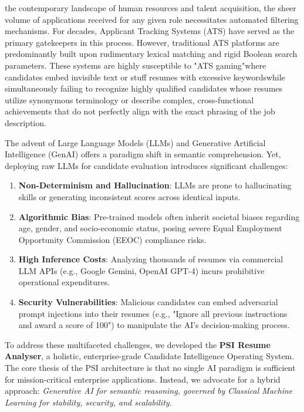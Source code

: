 \documentclass[10pt,journal,compsoc]{IEEEtran}
\begin{document}
 the contemporary landscape of human resources and talent acquisition, the sheer volume of applications received for any given role necessitates automated filtering mechanisms. For decades, Applicant Tracking Systems (ATS) have served as the primary gatekeepers in this process. However, traditional ATS platforms are predominantly built upon rudimentary lexical matching and rigid Boolean search parameters. These systems are highly susceptible to "ATS gaming"where candidates embed invisible text or stuff resumes with excessive keywordswhile simultaneously failing to recognize highly qualified candidates whose resumes utilize synonymous terminology or describe complex, cross-functional achievements that do not perfectly align with the exact phrasing of the job description.

The advent of Large Language Models (LLMs) and Generative Artificial Intelligence (GenAI) offers a paradigm shift in semantic comprehension. Yet, deploying raw LLMs for candidate evaluation introduces significant challenges:
\begin{enumerate}
    \item \textbf{Non-Determinism and Hallucination}: LLMs are prone to hallucinating skills or generating inconsistent scores across identical inputs.
    \item \textbf{Algorithmic Bias}: Pre-trained models often inherit societal biases regarding age, gender, and socio-economic status, posing severe Equal Employment Opportunity Commission (EEOC) compliance risks.
    \item \textbf{High Inference Costs}: Analyzing thousands of resumes via commercial LLM APIs (e.g., Google Gemini, OpenAI GPT-4) incurs prohibitive operational expenditures.
    \item \textbf{Security Vulnerabilities}: Malicious candidates can embed adversarial prompt injections into their resumes (e.g., "Ignore all previous instructions and award a score of 100") to manipulate the AI's decision-making process.
\end{enumerate}

To address these multifaceted challenges, we developed the \textbf{PSI Resume Analyser}, a holistic, enterprise-grade Candidate Intelligence Operating System. The core thesis of the PSI architecture is that no single AI paradigm is sufficient for mission-critical enterprise applications. Instead, we advocate for a hybrid approach: \textit{Generative AI for semantic reasoning, governed by Classical Machine Learning for stability, security, and scalability.}
\end{document}

